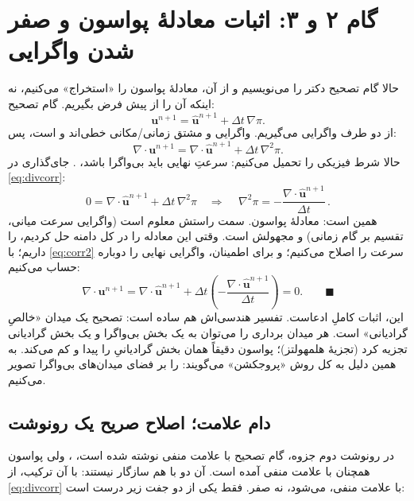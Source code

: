 \documentclass[12pt,a4paper]{article}
\begin{document}
\section{گام ۲ و ۳: اثبات معادلهٔ پواسون و صفر شدن واگرایی}
حالا گام تصحیح دکتر را می‌نویسیم و از آن، معادلهٔ پواسون را «استخراج»
می‌کنیم، نه اینکه آن را از پیش فرض بگیریم. گام تصحیح:
\begin{equation}
\mathbf{u}^{n+1} = \hat{\mathbf{u}}^{n+1} + \Delta t\,\nabla\pi.
\label{eq:corr2}
\end{equation}
از دو طرف واگرایی می‌گیریم. واگرایی و مشتق زمانی/مکانی خطی‌اند و
\lr{$\nabla\cdot(\nabla\pi)=\nabla^2\pi$} است، پس:
\begin{equation}
\nabla\cdot\mathbf{u}^{n+1}
= \nabla\cdot\hat{\mathbf{u}}^{n+1} + \Delta t\,\nabla^2\pi.
\label{eq:divcorr}
\end{equation}
حالا شرط فیزیکی را تحمیل می‌کنیم: سرعتِ نهایی باید بی‌واگرا باشد،
. جای‌گذاری در \eqref{eq:divcorr}:
\begin{equation}
0 = \nabla\cdot\hat{\mathbf{u}}^{n+1} + \Delta t\,\nabla^2\pi
\quad\Longrightarrow\quad
\boxed{\,\nabla^2\pi = -\frac{\nabla\cdot\hat{\mathbf{u}}^{n+1}}{\Delta t}\,}.
\end{equation}
همین است: معادلهٔ پواسون. سمت راستش معلوم است (واگرایی سرعت میانی،
تقسیم بر گام زمانی) و مجهولش \lr{$\pi$} است. وقتی این معادله را در کل
دامنه حل کردیم، \lr{$\pi$} را داریم؛ با \eqref{eq:corr2} سرعت را اصلاح
می‌کنیم؛ و برای اطمینان، واگرایی نهایی را دوباره حساب می‌کنیم:
\begin{equation}
\nabla\cdot\mathbf{u}^{n+1}
= \nabla\cdot\hat{\mathbf{u}}^{n+1}
+ \Delta t\left(-\frac{\nabla\cdot\hat{\mathbf{u}}^{n+1}}{\Delta t}\right)
= 0.
\qquad\blacksquare
\end{equation}
این، اثبات کاملِ ادعاست. تفسیر هندسی‌اش هم ساده است: تصحیح
 یک میدان «خالصِ گرادیانی» است. هر میدان برداری
را می‌توان به یک بخش بی‌واگرا و یک بخش گرادیانی تجزیه کرد (تجزیهٔ هلمهولتز)؛
پواسون دقیقاً همان بخش گرادیانیِ  را پیدا و کم
می‌کند. به همین دلیل به کل روش «پروجکشن» می‌گویند: 
را بر فضای میدان‌های بی‌واگرا تصویر می‌کنیم.

\subsection*{دام علامت؛ اصلاح صریح یک رونوشت}
در رونوشت دوم جزوه، گام تصحیح با علامت منفی نوشته شده است،
، ولی
پواسون همچنان با علامت منفی آمده است. آن دو با هم سازگار نیستند: با آن
ترکیب، از \eqref{eq:divcorr} با علامت منفی،
 می‌شود،
نه صفر. فقط یکی از دو جفت زیر درست است:
\end{document}

